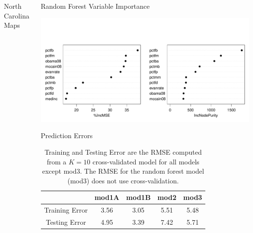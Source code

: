 \documentclass[final]{beamer}\usepackage[]{graphicx}\usepackage[]{color}
\makeatletter
\def\maxwidth{ %
  \ifdim\Gin@nat@width>\linewidth
    \linewidth
  \else
    \Gin@nat@width
  \fi
}
\newenvironment{knitrout}{}{} %
\makeatother
\begin{document}
\begin{frame}[fragile]
\begin{columns}[t]
\begin{column}{0.31\linewidth}
\begin{minipage}[t][.955\textheight]{\linewidth}
\begin{block}{North Carolina Maps}
\begin{knitrout}
{}



\end{knitrout}
\vspace{-2ex}
\end{block}
\vfill

\end{minipage}
\end{column}%

\begin{column}{0.31\linewidth}
\begin{minipage}[t][.955\textheight]{\linewidth} 
\vspace{0ex}
\begin{block}{Random Forest Variable Importance}
\vspace{-6ex}
\begin{knitrout}
\color{fgcolor}

{\centering \includegraphics[width=\maxwidth]{figure/Rforest-1} 

}



\end{knitrout}
\vspace{-2ex}
\vfill
\end{block}
\vfill

\begin{block}{Prediction Errors}
\begin{table}[ht]
\centering
\begin{tabular}{ccccc}
  \hline
 & mod1A & mod1B & mod2 & mod3 \\ 
  \hline
Training Error & 3.56 & 3.05 & 5.51 & 5.48 \\ 
  Testing Error & 4.95 & 3.39 & 7.42 & 5.71 \\ 
   \hline
\end{tabular}
\caption{Training and Testing Error are the RMSE computed from a $K=10$ cross-validated model for all models except mod3.  The RMSE for the random forest model (mod3) does not use cross-validation.} 
\label{PT}
\end{table}


\end{block}
\end{minipage}
\end{column}
\end{columns}
\end{frame}
\end{document}
